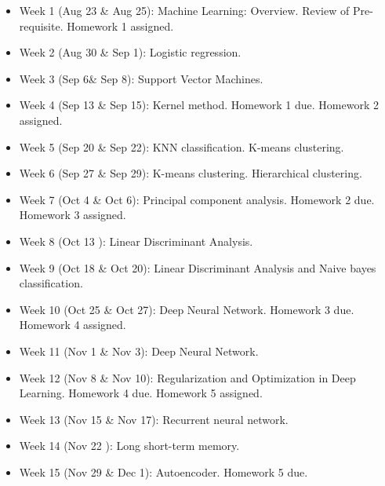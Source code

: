 \documentclass[a4paper,10pt]{article}
\begin{document}
\begin{itemize}

\item Week 1 (Aug 23 \& Aug 25): Machine Learning: Overview.  Review of Pre-requisite. Homework 1 assigned. 

\item Week 2 (Aug 30 \& Sep 1): Logistic regression. 

\item Week 3 (Sep 6\& Sep 8):  Support Vector Machines. 

\item Week 4 (Sep 13 \& Sep 15): Kernel method. Homework 1 due. Homework 2 assigned.

\item Week 5 (Sep 20 \& Sep 22): KNN classification. K-means clustering. 

\item Week 6 (Sep 27 \& Sep 29): K-means clustering. Hierarchical clustering. 

\item Week 7 (Oct 4 \& Oct 6): Principal component analysis. Homework 2 due. Homework 3 assigned.

\item Week 8 (Oct 13 ):  Linear Discriminant Analysis. 

\item Week 9 (Oct 18 \& Oct 20):  Linear Discriminant Analysis and Naive bayes classification. 

\item Week 10 (Oct 25 \& Oct 27):  Deep Neural Network.  Homework 3 due. Homework 4 assigned.

\item Week 11 (Nov 1 \& Nov 3):   Deep Neural Network. 

\item Week 12 (Nov 8 \& Nov 10): Regularization and Optimization in Deep Learning.  Homework 4 due. Homework 5 assigned. 

\item Week 13 (Nov 15 \& Nov 17):  Recurrent neural network.

\item Week 14 (Nov 22 ): Long short-term memory.

\item Week 15 (Nov 29 \& Dec 1): Autoencoder. Homework 5 due. 
 
\end{itemize}
\end{document}
